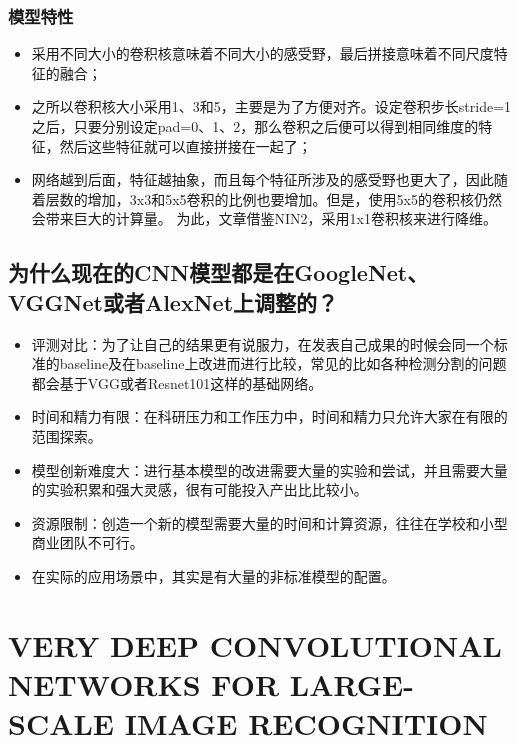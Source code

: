 \documentclass[12pt,a4paper,UTF8,twoside]{book}
\providecommand{\tightlist}{%
  \setlength{\itemsep}{0pt}\setlength{\parskip}{0pt}}
\begin{document}
\hypertarget{ux6a21ux578bux7279ux6027-4}{%
\subsection{模型特性}\label{ux6a21ux578bux7279ux6027-4}}

\begin{itemize}
\tightlist
\item
  采用不同大小的卷积核意味着不同大小的感受野，最后拼接意味着不同尺度特征的融合；
\item
  之所以卷积核大小采用1、3和5，主要是为了方便对齐。设定卷积步长stride=1之后，只要分别设定pad=0、1、2，那么卷积之后便可以得到相同维度的特征，然后这些特征就可以直接拼接在一起了；
\item
  网络越到后面，特征越抽象，而且每个特征所涉及的感受野也更大了，因此随着层数的增加，3x3和5x5卷积的比例也要增加。但是，使用5x5的卷积核仍然会带来巨大的计算量。 为此，文章借鉴NIN2，采用1x1卷积核来进行降维。
\end{itemize}

\hypertarget{ux4e3aux4ec0ux4e48ux73b0ux5728ux7684cnnux6a21ux578bux90fdux662fux5728googlenetvggnetux6216ux8005alexnetux4e0aux8c03ux6574ux7684}{%
\section{为什么现在的CNN模型都是在GoogleNet、VGGNet或者AlexNet上调整的？}\label{ux4e3aux4ec0ux4e48ux73b0ux5728ux7684cnnux6a21ux578bux90fdux662fux5728googlenetvggnetux6216ux8005alexnetux4e0aux8c03ux6574ux7684}}

\begin{itemize}
\tightlist
\item
  评测对比：为了让自己的结果更有说服力，在发表自己成果的时候会同一个标准的baseline及在baseline上改进而进行比较，常见的比如各种检测分割的问题都会基于VGG或者Resnet101这样的基础网络。
\item
  时间和精力有限：在科研压力和工作压力中，时间和精力只允许大家在有限的范围探索。
\item
  模型创新难度大：进行基本模型的改进需要大量的实验和尝试，并且需要大量的实验积累和强大灵感，很有可能投入产出比比较小。
\item
  资源限制：创造一个新的模型需要大量的时间和计算资源，往往在学校和小型商业团队不可行。
\item
  在实际的应用场景中，其实是有大量的非标准模型的配置。
\end{itemize}

\hypertarget{very-deep-convolutional-networks-for-large-scale-image-recognition}{%
\chapter{VERY DEEP CONVOLUTIONAL NETWORKS FOR LARGE-SCALE IMAGE RECOGNITION}\label{very-deep-convolutional-networks-for-large-scale-image-recognition}}
\end{document}
